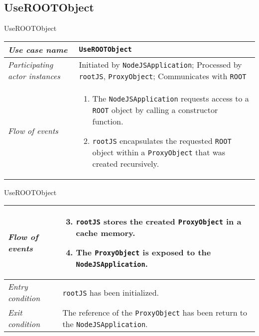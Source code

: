 \subsection{UseROOTObject}
\begin{frame}{UseROOTObject}
        \begin{longtable}{p{3cm} @{\hskip 1cm} p{7cm}}
                \hline

                \textit{Use case name} & \texttt{UseROOTObject}\\
                \hline

                \textit{Participating actor instances} &
                Initiated by \texttt{NodeJSApplication}; Processed by \texttt{rootJS}, \texttt{ProxyObject}; Communicates with \texttt{ROOT}\\
                \hline

                \textit{Flow of events} &
                        \begin{enumerate}
                                \item The \texttt{NodeJSApplication} requests access to a \texttt{ROOT} object by calling a constructor function.
                                \item \texttt{rootJS} encapsulates the requested \texttt{ROOT} object within a \texttt{ProxyObject} that was created recursively.
                        \end{enumerate}
                        \\
        \end{longtable}
\end{frame}
\begin{frame}[t]{UseROOTObject}
        \begin{longtable}{p{3cm} @{\hskip 1cm} p{7cm}}
                \textit{Flow of events} &
                        \begin{enumerate}
                                \setcounter{enumi}{2}
                                \item \texttt{rootJS} stores the created \texttt{ProxyObject} in a cache memory.
                                \item The \texttt{ProxyObject} is exposed to the \texttt{NodeJSApplication}.
                        \end{enumerate}
                        \\
                \hline

                \textit{Entry condition} & \texttt{rootJS} has been initialized.\\
                \hline

                \textit{Exit condition} & The reference of the \texttt{ProxyObject} has been return to the \texttt{NodeJSApplication}.\\
                \hline
        \end{longtable}
\end{frame}


